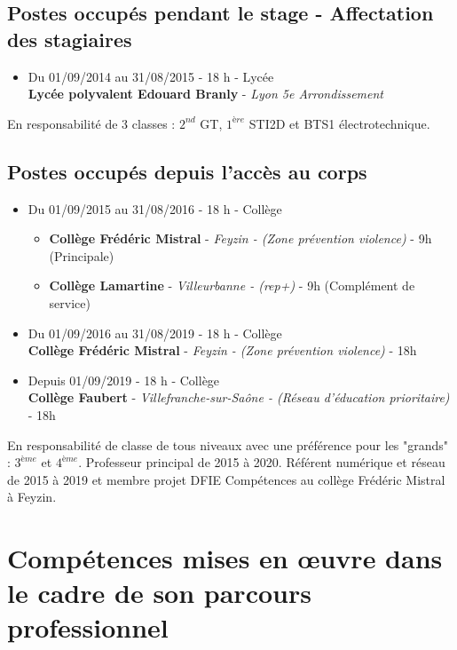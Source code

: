 \documentclass[11pt]{article}
\begin{document}
\subsection{Postes occupés pendant le stage - Affectation des stagiaires }

\begin{itemize}
  \item Du 01/09/2014 au 31/08/2015 - 18 h - Lycée\\
    \textbf{Lycée polyvalent Edouard Branly} - \textit{Lyon 5e Arrondissement} \\
\end{itemize}
En responsabilité de 3 classes : $2^{nd}$ GT, $1^{ère}$ STI2D et BTS1 électrotechnique.


\subsection{Postes occupés depuis l’accès au corps}

\begin{itemize}
  \item Du 01/09/2015 au 31/08/2016 - 18 h - Collège
  \begin{itemize}
    \item \textbf{Collège Frédéric Mistral} - \textit{Feyzin - (Zone prévention violence)} - 9h (Principale)
    \item \textbf{Collège Lamartine} - \textit{Villeurbanne - (rep+)} - 9h (Complément de service)
  \end{itemize}
  \item Du 01/09/2016 au 31/08/2019 - 18 h - Collège\\
    \textbf{Collège Frédéric Mistral} - \textit{Feyzin - (Zone prévention violence)} - 18h
  \item Depuis 01/09/2019 - 18 h - Collège\\
    \textbf{Collège Faubert} - \textit{Villefranche-sur-Saône - (Réseau d'éducation prioritaire)} - 18h \\
\end{itemize}
En responsabilité de classe de tous niveaux avec une préférence pour les "grands" : $3^{ème}$ et $4^{ème}$. Professeur principal de 2015 à 2020. Référent numérique et réseau de 2015 à 2019 et membre projet DFIE Compétences au collège Frédéric Mistral à Feyzin.

\newpage

\section{Compétences mises en œuvre dans le cadre de son parcours professionnel}
\end{document}
